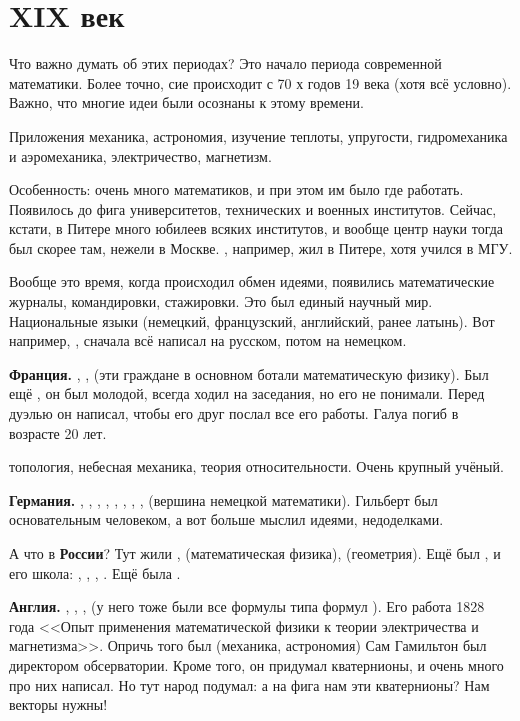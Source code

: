 \documentclass[a4paper,oneside,fleqn,10pt]{article}
\begin{document}

\section{XIX век}

Что важно думать об этих периодах? Это начало периода современной математики.
Более точно, сие происходит с 70 х годов 19 века (хотя всё условно).
Важно, что многие идеи были осознаны к этому времени.

Приложения механика, астрономия, изучение теплоты, упругости, гидромеханика и аэромеханика,
электричество, магнетизм.

Особенность: очень много математиков, и при этом им было где работать. Появилось
до фига университетов, технических и военных институтов. Сейчас, кстати, в Питере много юбилеев
всяких институтов, и вообще центр науки тогда был скорее там, нежели в Москве.
, например, жил в Питере, хотя учился в МГУ.

Вообще это время, когда происходил обмен идеями, появились математические журналы,
командировки, стажировки. Это был единый научный мир. Национальные языки (немецкий, французский, английский,
ранее латынь). Вот например, , сначала всё написал на русском, потом на немецком.

\textbf{Франция.} , ,  (эти граждане в основном ботали математическую физику).
Был ещё , он был молодой, всегда ходил на заседания,  но его не понимали.
Перед дуэлью он написал, чтобы его друг послал  все его работы.
Галуа погиб в возрасте 20 лет.

 топология, небесная механика, теория относительности. Очень крупный учёный.

\textbf{Германия.} , , , , ,
, , ,  (вершина
немецкой математики). Гильберт был основательным человеком, а вот  больше мыслил идеями,
недоделками.

А что в \textbf{России}? Тут жили ,  (математическая физика),
 (геометрия). Ещё был , и его школа: ,
, , . Ещё была .

\textbf{Англия.} , , , 
(у него тоже были все формулы типа формул ).
Его работа 1828 года <<Опыт применения математической физики к теории электричества и магнетизма>>.
Опричь того был  (механика, астрономия) Сам Гамильтон был директором обсерватории.
Кроме того, он придумал кватернионы, и очень много про них написал.
Но тут народ подумал: а на фига нам эти кватернионы? Нам векторы нужны!
\end{document}
